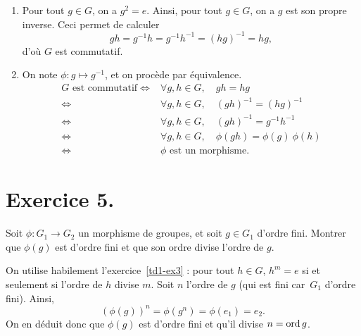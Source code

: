 \documentclass[./main]{subfiles}
\begin{document}
  \begin{enumerate}
    \item Pour tout $g \in G$, on a $g^2 = e$. 
      Ainsi, pour tout $g \in G$, on a $g$ est son propre inverse.
      Ceci permet de calculer \[
        gh = g^{-1} h = g^{-1}h^{-1} = (h g)^{-1} = h g
      ,\] 
      d'où $G$ est commutatif.
    \item On note $\phi : g \mapsto g^{-1}$, et on procède par équivalence.
      \begin{align*}
        G \text{ est commutatif} \iff& \forall g, h \in G, \quad gh = hg\\
        \iff& \forall g,h \in G, \quad(gh)^{-1} = (hg)^{-1}\\
        \iff& \forall g,h \in G, \quad(gh)^{-1} = g^{-1}h^{-1}\\
        \iff& \forall g,h \in G,\quad\phi(gh) = \phi(g)\:\phi(h)\\
        \iff& \phi \text{ est un morphisme}
      .\end{align*}
  \end{enumerate}

  \section{Exercice 5.}
  \begin{enonce}
    Soit $\phi : G_1 \to G_2$ un morphisme de groupes, et soit $g \in G_1$ d'ordre fini. Montrer que $\phi(g)$ est d'ordre fini et que son ordre divise l'ordre de  $g$.
  \end{enonce}

  On utilise habilement l'exercice~\ref{td1-ex3} : pour tout $h \in G$, $h^m = e$ si et seulement si l'ordre de $h$ divise $m$.
  Soit $n$ l'ordre de $g$ (qui est fini car~$G_1$ d'ordre fini).
  Ainsi, \[
    (\phi(g))^n = \phi(g^n) = \phi(e_1) = e_2
  .\]
  On en déduit donc que $\phi(g)$ est d'ordre fini et qu'il divise $n = \operatorname{ord} g$.
\end{document}
